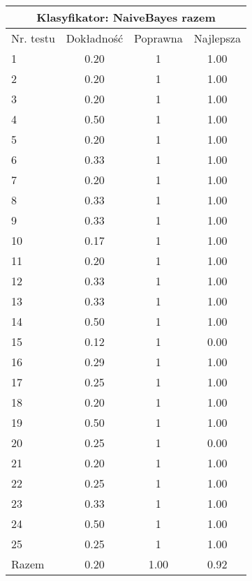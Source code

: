 \documentclass[notitlepage,leqno,fleqn,a4paper]{article}
\begin{document}
\begin{tabular}{|l|c|c|c|}
\hline
\multicolumn{4}{|c|}{Klasyfikator: NaiveBayes razem}\\
\hline
Nr. testu & Dokładność & Poprawna & Najlepsza\\
\hline
1 & 0.20 & 1 & 1.00 \\
2 & 0.20 & 1 & 1.00 \\
3 & 0.20 & 1 & 1.00 \\
4 & 0.50 & 1 & 1.00 \\
5 & 0.20 & 1 & 1.00 \\
6 & 0.33 & 1 & 1.00 \\
7 & 0.20 & 1 & 1.00 \\
8 & 0.33 & 1 & 1.00 \\
9 & 0.33 & 1 & 1.00 \\
10 & 0.17 & 1 & 1.00 \\
11 & 0.20 & 1 & 1.00 \\
12 & 0.33 & 1 & 1.00 \\
13 & 0.33 & 1 & 1.00 \\
14 & 0.50 & 1 & 1.00 \\
15 & 0.12 & 1 & 0.00 \\
16 & 0.29 & 1 & 1.00 \\
17 & 0.25 & 1 & 1.00 \\
18 & 0.20 & 1 & 1.00 \\
19 & 0.50 & 1 & 1.00 \\
20 & 0.25 & 1 & 0.00 \\
21 & 0.20 & 1 & 1.00 \\
22 & 0.25 & 1 & 1.00 \\
23 & 0.33 & 1 & 1.00 \\
24 & 0.50 & 1 & 1.00 \\
25 & 0.25 & 1 & 1.00 \\
\hline
Razem & 0.20 & 1.00 & 0.92 \\
\hline
\end{tabular}
\end{document}
